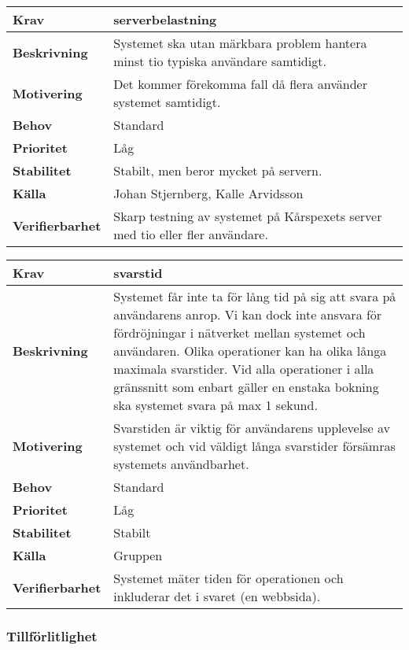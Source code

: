 \documentclass[a4paper, twoside, 11pt, titlepage]{article}
\begin{document}
		\begin{tabular} { | p{3cm} | p{12.2cm} | }
			\hline
			\textbf{Krav} & serverbelastning  \\
			\hline
			\textbf{Beskrivning} & Systemet ska utan märkbara problem hantera minst tio typiska användare samtidigt.  \\
			\hline
			\textbf{Motivering} & Det kommer förekomma fall då flera använder systemet samtidigt.  \\
			\hline
			\textbf{Behov} & Standard  \\
			\hline
			\textbf{Prioritet} & Låg  \\
			\hline
			\textbf{Stabilitet} & Stabilt, men beror mycket på servern.  \\
			\hline
			\textbf{Källa} & Johan Stjernberg, Kalle Arvidsson  \\
			\hline
			\textbf{Verifierbarhet} & Skarp testning av systemet på Kårspexets server med tio eller fler användare.  \\
			\hline
		\end{tabular}

		\begin{tabular} { | p{3cm} | p{12.2cm} | }
			\hline
			\textbf{Krav} & svarstid  \\
			\hline
			\textbf{Beskrivning} & Systemet får inte ta för lång tid på sig att svara på användarens anrop. Vi kan dock inte ansvara för fördröjningar i nätverket mellan systemet och användaren. Olika operationer kan ha olika långa maximala svarstider. Vid alla operationer i alla gränssnitt som enbart gäller en enstaka bokning ska systemet svara på max 1 sekund.  \\
			\hline
			\textbf{Motivering} & Svarstiden är viktig för användarens upplevelse av systemet och vid väldigt långa svarstider försämras systemets användbarhet.  \\
			\hline
			\textbf{Behov} & Standard  \\
			\hline
			\textbf{Prioritet} & Låg  \\
			\hline
			\textbf{Stabilitet} & Stabilt  \\
			\hline
			\textbf{Källa} & Gruppen  \\
			\hline
			\textbf{Verifierbarhet} & Systemet mäter tiden för operationen och inkluderar det i svaret (en webbsida).  \\
			\hline
		\end{tabular}


	\subsubsection{Tillförlitlighet}
\end{document}
